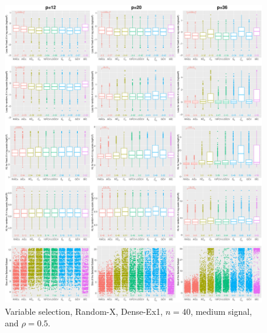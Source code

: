 \begin{figure}[!ht]
\centering
\includegraphics[width=\textwidth]{figures/supplement/randomx/subset_selection/Dense-Ex1_n40_msnr_rho05.eps}
\caption{Variable selection, Random-X, Dense-Ex1, $n=40$, medium signal, and $\rho=0.5$.}
\end{figure}
\clearpage
